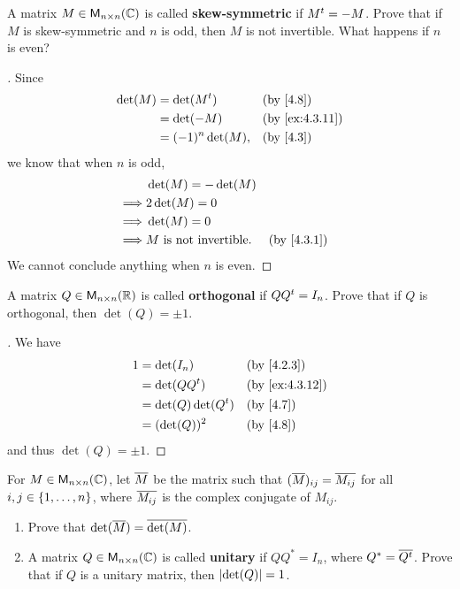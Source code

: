 \begin{ex}\label{ex:4.3.11}
  A matrix \(M \in \ms[n][n][\C]\) is called \textbf{skew-symmetric} if \({M}^{t} = -M\).
  Prove that if \(M\) is skew-symmetric and \(n\) is odd, then \(M\) is not invertible.
  What happens if \(n\) is even?
\end{ex}

\begin{proof}[]
  Since
  \begin{align*}
    \det(M) & = \det(\tp{M})    &  & \by{4.8}       \\
            & = \det(-M)        &  & \by{ex:4.3.11} \\
            & = (-1)^n \det(M), &  & \by{4.3}
  \end{align*}
  we know that when \(n\) is odd,
  \begin{align*}
             & \det(M) = -\det(M)                           \\
    \implies & 2 \det(M) = 0                                \\
    \implies & \det(M) = 0                                  \\
    \implies & M \text{ is not invertible}. &  & \by{4.3.1}
  \end{align*}
  We cannot conclude anything when \(n\) is even.
\end{proof}

\begin{ex}\label{ex:4.3.12}
  A matrix \(Q \in \ms[n][n][\R]\) is called \textbf{orthogonal} if \(Q {Q}^{t} = I_n\).
  Prove that if \(Q\) is orthogonal, then \(\det(Q) = \pm 1\).
\end{ex}

\begin{proof}[]
  We have
  \begin{align*}
    1 & = \det(I_n)            &  & \by{4.2.3}     \\
      & = \det(Q \tp{Q})       &  & \by{ex:4.3.12} \\
      & = \det(Q) \det(\tp{Q}) &  & \by{4.7}       \\
      & = (\det(Q))^2          &  & \by{4.8}
  \end{align*}
  and thus \(\det(Q) = \pm 1\).
\end{proof}

\begin{ex}\label{ex:4.3.13}
  For \(M \in \ms[n][n][\C]\), let \(\overline{M}\) be the matrix such that \((\overline{M})_{i j} = \overline{M_{i j}}\) for all \(i, j \in \left\lbrace1, \dots, n\right\rbrace\), where \(\overline{M_{i j}}\) is the complex conjugate of \(M_{i j}\).
  \begin{enumerate}
    \item Prove that \(\det(\overline{M}) = \overline{\det(M)}\).
    \item A matrix \(Q \in \ms[n][n][\C]\) is called \textbf{unitary} if \(Q Q^* = I_n\), where \(Q^* = \overline{{Q}^{t}}\).
          Prove that if \(Q\) is a unitary matrix, then \(\left\lvert\det(Q)\right\rvert = 1\).
  \end{enumerate}
\end{ex}

